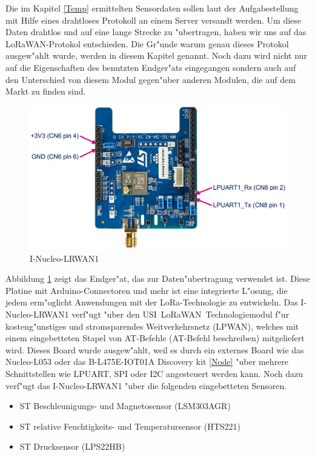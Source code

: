 Die im Kapitel \ref{Temp} ermittelten Sensordaten sollen laut der 
Aufgabestellung mit Hilfe eines drahtloses Protokoll an einem Server 
versandt werden. Um diese Daten drahtlos und auf eine lange Strecke zu 
"ubertragen, haben wir uns auf das LoRaWAN-Protokol entschieden. Die 
Gr"unde warum genau dieses Protokol ausgew"ahlt wurde, werden in 
diesem Kapitel genannt. Noch dazu wird nicht nur auf die Eigenschaften 
des benutzten Endger"ats eingegangen sondern auch auf den Unterschied 
von diesem Modul gegen"uber anderen Modulen, die auf dem Markt zu 
finden sind.   
 
 
\begin{figure}[h]
	\centering
	\includegraphics[width=14cm]{source/images/LoRa_mod}
	\caption{I-Nucleo-LRWAN1 \cite{LoRaMod}\label{fig:loraMod}}
\end{figure}

Abbildung \ref{fig:loraMod} zeigt das Endger"at, das zur 
Daten"ubertragung verwendet ist. Diese Platine mit Arduino-Connectoren 
und mehr ist eine integrierte L"osung, die jedem erm"oglicht 
Anwendungen mit der LoRa-Technologie zu entwickeln. Das 
I-Nucleo-LRWAN1 verf"ugt "uber den USI\textregistered\ 
LoRaWAN\texttrademark\ Technologiemodul f"ur kosteng"unstiges und 
stromsparendes Weitverkehrsnetz (LPWAN), welches mit einem 
eingebetteten Stapel von AT-Befehle (AT-Befehl beschreiben) 
mitgeliefert wird. Dieses Board wurde ausgew"ahlt, weil es durch ein 
externes Board wie das Nucleo-L053 oder das B-L475E-IOT01A Discovery 
kit \ref{Node} "uber mehrere Schnittstellen wie \ac{LPUART}, \ac{SPI} 
oder I2C angesteuert werden kann. Noch dazu verf"ugt das 
I-Nucleo-LRWAN1 "uber die folgenden eingebetteten Sensoren.

\begin{itemize}
	\item ST Beschleunigungs- und Magnetosensor (LSM303AGR)
	\item ST relative Feuchtigkeits- und Temperatursensor (HTS221)
	\item ST Drucksensor (LPS22HB)
\end{itemize}

